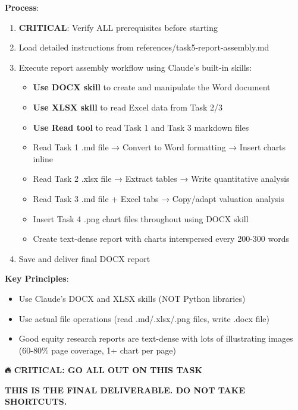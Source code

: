\documentclass[11pt]{article}
\begin{document}
\textbf{Process}:

\begin{enumerate}[leftmargin=*,itemsep=2pt,topsep=2pt]
\item {} \textbf{CRITICAL}: Verify ALL prerequisites before starting
\item {} Load detailed instructions from references/task5-report-assembly.md
\item {} Execute report assembly workflow using Claude's built-in skills:
\begin{itemize}[leftmargin=*,itemsep=2pt,topsep=2pt]
\item {} \textbf{Use DOCX skill} to create and manipulate the Word document
\item {} \textbf{Use XLSX skill} to read Excel data from Task 2/3
\item {} \textbf{Use Read tool} to read Task 1 and Task 3 markdown files
\item {} Read Task 1 .md file → Convert to Word formatting → Insert charts inline
\item {} Read Task 2 .xlsx file → Extract tables → Write quantitative analysis
\item {} Read Task 3 .md file + Excel tabs → Copy/adapt valuation analysis
\item {} Insert Task 4 .png chart files throughout using DOCX skill
\item {} Create text-dense report with charts interspersed every 200-300 words
\end{itemize}
\item {} Save and deliver final DOCX report
\end{enumerate}

\textbf{Key Principles}:

\begin{itemize}[leftmargin=*,itemsep=2pt,topsep=2pt]
\item {} Use Claude's DOCX and XLSX skills (NOT Python libraries)
\item {} Use actual file operations (read .md/.xlsx/.png files, write .docx file)
\item {} Good equity research reports are text-dense with lots of illustrating images (60-80\% page coverage, 1+ chart per page)
\end{itemize}

\textbf{🔥 CRITICAL: GO ALL OUT ON THIS TASK}


\textbf{THIS IS THE FINAL DELIVERABLE. DO NOT TAKE SHORTCUTS.}
\end{document}
